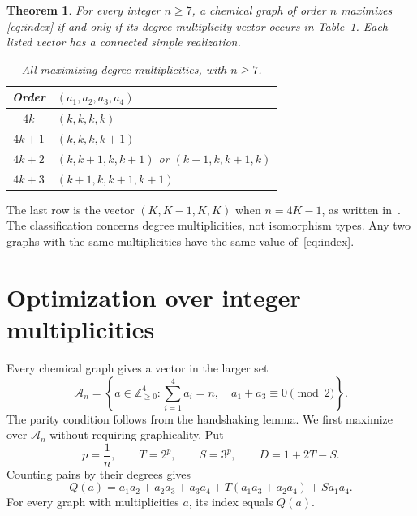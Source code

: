 \documentclass[11pt]{article}
\newtheorem{theorem}{Theorem}
\newcommand{\Z}{\mathbb Z}
\begin{document}
\begin{theorem}\label{thm:main}
For every integer $n\geq7$, a chemical graph of order $n$ maximizes
\eqref{eq:index} if and only if its degree-multiplicity vector occurs in
Table~\ref{tab:winners}. Each listed vector has a connected simple
realization.
\begin{table}[ht]
\centering
\begin{tabular}{cl}
\toprule
Order & $(a_1,a_2,a_3,a_4)$\\
\midrule
$4k$ & $(k,k,k,k)$\\
$4k+1$ & $(k,k,k,k+1)$\\
$4k+2$ & $(k,k+1,k,k+1)$ or $(k+1,k,k+1,k)$\\
$4k+3$ & $(k+1,k,k+1,k+1)$\\
\bottomrule
\end{tabular}
\caption{All maximizing degree multiplicities, with $n\geq7$.}
\label{tab:winners}
\end{table}
\end{theorem}

The last row is the vector $(K,K-1,K,K)$ when $n=4K-1$, as written
in~\cite{knor}. The classification concerns degree multiplicities, not
isomorphism types. Any two graphs with the same multiplicities have the
same value of~\eqref{eq:index}.

\section{Optimization over integer multiplicities}

Every chemical graph gives a vector in the larger set
\[
 \mathcal A_n=\left\{a\in\Z_{\geq0}^4:
 \sum_{i=1}^4a_i=n,\quad a_1+a_3\equiv0\pmod2\right\}.
\]
The parity condition follows from the handshaking lemma. We first maximize
over $\mathcal A_n$ without requiring graphicality. Put
\[
 p=\frac1n,\qquad T=2^p,\qquad S=3^p,\qquad D=1+2T-S.
\]
Counting pairs by their degrees gives
\begin{equation}\label{eq:Q}
 Q(a)=a_1a_2+a_2a_3+a_3a_4+T(a_1a_3+a_2a_4)+Sa_1a_4.
\end{equation}
For every graph with multiplicities $a$, its index equals $Q(a)$.
\end{document}
